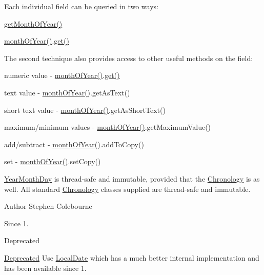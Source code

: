 Each individual field can be queried in two ways\-: 
\begin{DoxyItemize}
\item {\ttfamily \hyperlink{classorg_1_1joda_1_1time_1_1_year_month_day_a3715ef40e7f16a3ae95f0ac58f2a5b31}{get\-Month\-Of\-Year()}} 
\item {\ttfamily \hyperlink{classorg_1_1joda_1_1time_1_1_year_month_day_aee12513f0a474e8f9d986f3b3b5c8f82}{month\-Of\-Year()}.\hyperlink{interfaceorg_1_1joda_1_1time_1_1_readable_partial_a5844c779ac1ebd81281466fe2d23547a}{get()}} 
\end{DoxyItemize}The second technique also provides access to other useful methods on the field\-: 
\begin{DoxyItemize}
\item numeric value -\/ {\ttfamily \hyperlink{classorg_1_1joda_1_1time_1_1_year_month_day_aee12513f0a474e8f9d986f3b3b5c8f82}{month\-Of\-Year()}.\hyperlink{interfaceorg_1_1joda_1_1time_1_1_readable_partial_a5844c779ac1ebd81281466fe2d23547a}{get()}} 
\item text value -\/ {\ttfamily \hyperlink{classorg_1_1joda_1_1time_1_1_year_month_day_aee12513f0a474e8f9d986f3b3b5c8f82}{month\-Of\-Year()}.get\-As\-Text()} 
\item short text value -\/ {\ttfamily \hyperlink{classorg_1_1joda_1_1time_1_1_year_month_day_aee12513f0a474e8f9d986f3b3b5c8f82}{month\-Of\-Year()}.get\-As\-Short\-Text()} 
\item maximum/minimum values -\/ {\ttfamily \hyperlink{classorg_1_1joda_1_1time_1_1_year_month_day_aee12513f0a474e8f9d986f3b3b5c8f82}{month\-Of\-Year()}.get\-Maximum\-Value()} 
\item add/subtract -\/ {\ttfamily \hyperlink{classorg_1_1joda_1_1time_1_1_year_month_day_aee12513f0a474e8f9d986f3b3b5c8f82}{month\-Of\-Year()}.add\-To\-Copy()} 
\item set -\/ {\ttfamily \hyperlink{classorg_1_1joda_1_1time_1_1_year_month_day_aee12513f0a474e8f9d986f3b3b5c8f82}{month\-Of\-Year()}.set\-Copy()} 
\end{DoxyItemize}

\hyperlink{classorg_1_1joda_1_1time_1_1_year_month_day}{Year\-Month\-Day} is thread-\/safe and immutable, provided that the \hyperlink{classorg_1_1joda_1_1time_1_1_chronology}{Chronology} is as well. All standard \hyperlink{classorg_1_1joda_1_1time_1_1_chronology}{Chronology} classes supplied are thread-\/safe and immutable.

\begin{DoxyAuthor}{Author}
Stephen Colebourne 
\end{DoxyAuthor}
\begin{DoxySince}{Since}
1. 
\end{DoxySince}
\begin{DoxyRefDesc}{Deprecated}
\item[\hyperlink{deprecated__deprecated000019}{Deprecated}]Use \hyperlink{classorg_1_1joda_1_1time_1_1_local_date}{Local\-Date} which has a much better internal implementation and has been available since 1. \end{DoxyRefDesc}


